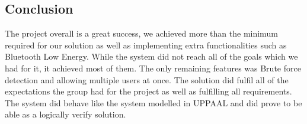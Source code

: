 \newpage\subsection{Conclusion}
The project overall is a great success, we achieved more than the minimum required for our solution as well as implementing extra functionalities such as Bluetooth Low Energy. While the system did not reach all of the goals which we had for it, it achieved most of them. The only remaining features was Brute force detection and allowing multiple users at once. The solution did fulfil all of the expectations the group had for the project as well as fulfilling all requirements. The system did behave like the system modelled in UPPAAL and did prove to be able as a logically verify solution.